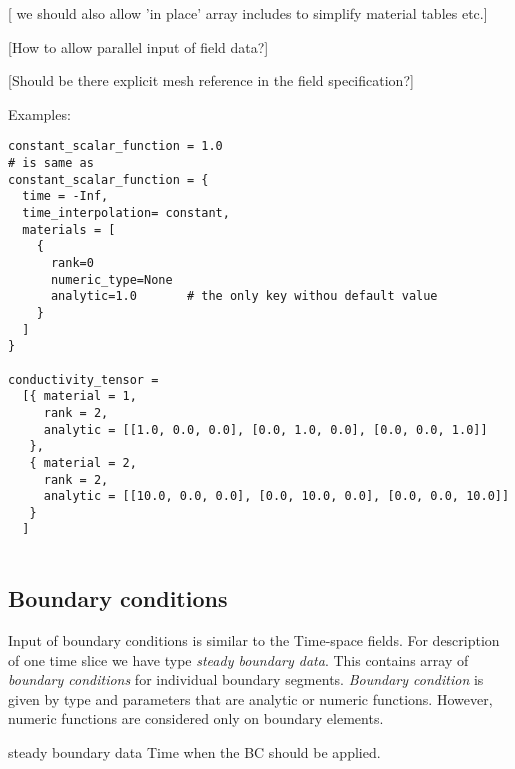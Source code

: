 [ we should also allow 'in place' array includes to simplify material tables etc.]

[How to allow parallel input of field data?]

[Should be there explicit mesh reference in the field specification?]


Examples:
\begin{verbatim}
constant_scalar_function = 1.0
# is same as
constant_scalar_function = {
  time = -Inf,
  time_interpolation= constant,
  materials = [
    {
      rank=0
      numeric_type=None
      analytic=1.0       # the only key withou default value
    }
  ]
}

conductivity_tensor = 
  [{ material = 1,
     rank = 2,
     analytic = [[1.0, 0.0, 0.0], [0.0, 1.0, 0.0], [0.0, 0.0, 1.0]]
   },
   { material = 2,
     rank = 2,
     analytic = [[10.0, 0.0, 0.0], [0.0, 10.0, 0.0], [0.0, 0.0, 10.0]]
   }
  ]
 
\end{verbatim}

\subsection{Boundary conditions}
Input of boundary conditions is similar to the Time-space fields. For description of one time slice we have 
type {\it steady boundary data}. This contains array of {\it boundary conditions} for individual boundary segments. 
{\it Boundary condition} is given by type and parameters that are analytic or numeric functions. However, numeric functions
are considered only on boundary elements.

\begin{recordtype}{steady boundary data}{}
Time when the BC should be applied.
\end{recordtype}

